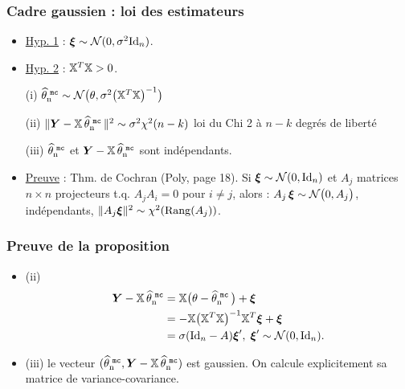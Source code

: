 
\begin{frame}
\frametitle{Cadre gaussien : loi des estimateurs}
\begin{itemize}
\item \underline{Hyp. 1} : $\boldsymbol{\xi} \sim {\mathcal N}(0,\sigma^2\mathrm{Id}_n)$.
\item \underline{Hyp. 2} : $\mathbb{X}^T \mathbb{X}>0$.
\end{itemize}
\begin{prop}
\begin{itemize}
\item[(i)] $\operatorname{\widehat \theta_n^{\,\,{\tt mc}}} \sim {\mathcal N}\big(\theta, \sigma^2 \big(\mathbb{X}^T\mathbb{X}\big)^{-1}\big)$
\item[(ii)] $\|\boldsymbol{Y}-\mathbb{X} \operatorname{\widehat \theta_n^{\,\,{\tt mc}}}\|^2 \sim
\sigma^2\chi^2(n-k)$ \alert{ loi du Chi 2 à $n-k$ degrés de liberté}
\item[(iii)] $\operatorname{\widehat \theta_n^{\,\,{\tt mc}}}$ et $\boldsymbol{Y}-\mathbb{X} \operatorname{\widehat \theta_n^{\,\,{\tt mc}}}$ sont indépendants.
\end{itemize}
\end{prop}
\begin{itemize}
\item \underline{Preuve} : \alert{Thm. de Cochran} (Poly, page 18). Si
$\boldsymbol{\xi}\sim {\mathcal N}(0,\mathrm{Id}_n)$ et $A_j$
matrices $n \times n$ projecteurs t.q. $A_jA_i=0$ pour $i\neq j$,
alors : $A_j\,\boldsymbol{\xi} \sim {\mathcal N}\big(0,A_j\big)$,
\alert{indépendants}, $\|A_j\boldsymbol{\xi}\|^2\sim
\chi^2(\mathrm{Rang}(A_j))$.
\end{itemize}
\end{frame}

\begin{frame}
\frametitle{Preuve de la proposition}
\begin{itemize}
\item (ii)
\begin{align*}
\boldsymbol{Y}-\mathbb{X} \operatorname{\widehat \theta_n^{\,\,{\tt mc}}} & = \mathbb{X}\big(\theta - \operatorname{\widehat \theta_n^{\,\,{\tt mc}}}\big)+\boldsymbol{\xi} \\
& = -\mathbb{X}\big(\mathbb{X}^T\mathbb{X}\big)^{-1}\mathbb{X}^T\boldsymbol{\xi}+\boldsymbol{\xi} \\
& =
\sigma(\text{Id}_n-A)\boldsymbol{\xi}',\;\boldsymbol{\xi}'\sim{\mathcal
N}(0,\mathrm{Id}_n).
\end{align*}
\item (iii) le vecteur $(\operatorname{\widehat \theta_n^{\,\,{\tt mc}}},\boldsymbol{Y}-\mathbb{X} \operatorname{\widehat \theta_n^{\,\,{\tt mc}}})$ est gaussien. On calcule explicitement sa matrice de variance-covariance.
\end{itemize}
\end{frame}


